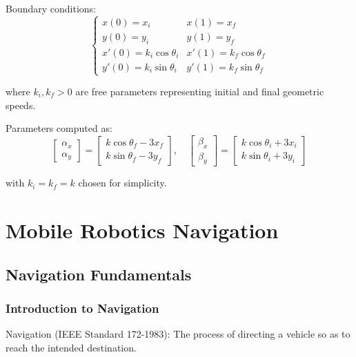 \documentclass[openany]{book}
\theoremstyle{definition}
\theoremstyle{remark}
\newcommand{\definitionbox}[1]{
\begin{tcolorbox}[colback=blue!5,colframe=blue!40!black,title=Definition]
 #1
\end{tcolorbox}
}
\begin{document}
Boundary conditions:
\begin{equation}
    \begin{cases}
        x(0) = x_i & x(1) = x_f \\
        y(0) = y_i & y(1) = y_f \\
        x'(0) = k_i\cos\theta_i & x'(1) = k_f\cos\theta_f \\
        y'(0) = k_i\sin\theta_i & y'(1) = k_f\sin\theta_f
    \end{cases}
\end{equation}

where $k_i, k_f > 0$ are free parameters representing initial and final geometric speeds.

Parameters computed as:
\begin{equation}
    \begin{bmatrix}
        \alpha_x \\ \alpha_y
    \end{bmatrix} =
    \begin{bmatrix}
        k\cos\theta_f - 3x_f \\
        k\sin\theta_f - 3y_f
    \end{bmatrix}, \quad
    \begin{bmatrix}
        \beta_x \\ \beta_y
    \end{bmatrix} =
    \begin{bmatrix}
        k\cos\theta_i + 3x_i \\
        k\sin\theta_i + 3y_i
    \end{bmatrix}
\end{equation}

with $k_i = k_f = k$ chosen for simplicity.


\part{Mobile Robotics Navigation}

\chapter{Navigation Fundamentals}

\section{Introduction to Navigation}

\definitionbox{Navigation (IEEE Standard 172-1983): The process of directing a vehicle so as to reach the intended destination.}
\end{document}
